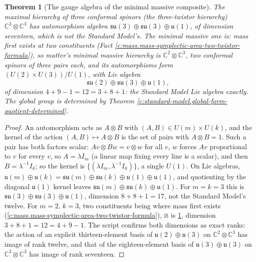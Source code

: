 \documentclass[11pt]{article}
\newtheorem{theorem}{Theorem}[section]
\theoremstyle{definition}
\theoremstyle{plain}
\newcommand{\changedmark}[2]{\marginpar{\raggedright\scriptsize\color{#1}#2}}
\providecommand{\C}{}\renewcommand{\C}{\mathbb{C}}
\providecommand{\su}{}\renewcommand{\su}{\mathfrak{su}}
\providecommand{\uu}{}\renewcommand{\uu}{\mathfrak{u}}
\begin{document}
\begin{theorem}[The gauge algebra of the minimal massive composite]\label{c:standard-model.gauge-algebra-minimal-massive-composite}
\changedmark{gray}{reworded}
The maximal hierarchy of three conformal spinors (the three-twistor hierarchy) $\C^{3} \otimes \C^{3}$ has automorphism algebra $\su(3) \oplus \su(3) \oplus \uu(1)$, of dimension seventeen, which is not the Standard Model's. The minimal massive one is: mass first exists at two constituents (Fact \ref{c:mass.mass-symplectic-area-two-twistor-formula}), so matter's \emph{minimal massive} hierarchy is $\C^{2} \otimes \C^{3}$, two conformal spinors of three pairs each, and its automorphisms form $(U(2) \times U(3))/U(1)$, with Lie algebra
\begin{equation}
\su(2) \oplus \su(3) \oplus \uu(1),
\end{equation}
of dimension $4 + 9 - 1 = 12 = 3 + 8 + 1$: the Standard Model Lie algebra exactly. The global group is determined by Theorem \ref{c:standard-model.global-form-quotient-determined}.
\end{theorem}
\begin{proof}
An automorphism acts as $A \otimes B$ with $(A, B) \in U(m) \times U(k)$, and the kernel of the action $(A, B) \mapsto A \otimes B$ is the set of pairs with $A \otimes B = 1$. Such a pair has both factors scalar: $Av \otimes Bw = v \otimes w$ for all $v$, $w$ forces $Av$ proportional to $v$ for every $v$, so $A = \lambda I_{m}$ (a linear map fixing every line is a scalar), and then $B = \lambda^{-1}I_{k}$; so the kernel is $\{(\lambda I_{m}, \lambda^{-1}I_{k})\}$, a single $U(1)$. On Lie algebras, $\uu(m) \oplus \uu(k) = \su(m) \oplus \su(k) \oplus \uu(1) \oplus \uu(1)$, and quotienting by the diagonal $\uu(1)$ kernel leaves $\su(m) \oplus \su(k) \oplus \uu(1)$. For $m = k = 3$ this is $\su(3) \oplus \su(3) \oplus \uu(1)$, dimension $8 + 8 + 1 = 17$, not the Standard Model's twelve. For $m = 2$, $k = 3$, two constituents being where mass first exists (\ref{c:mass.mass-symplectic-area-two-twistor-formula}), it is \ref{c:standard-model.gauge-algebra-minimal-massive-composite}, dimension $3 + 8 + 1 = 12 = 4 + 9 - 1$. The script confirms both dimensions as exact ranks: the action of an explicit thirteen-element basis of $\uu(2) \oplus \uu(3)$ on $\C^{2} \otimes \C^{3}$ has image of rank twelve, and that of the eighteen-element basis of $\uu(3) \oplus \uu(3)$ on $\C^{3} \otimes \C^{3}$ has image of rank seventeen.

\end{proof}
\end{document}

